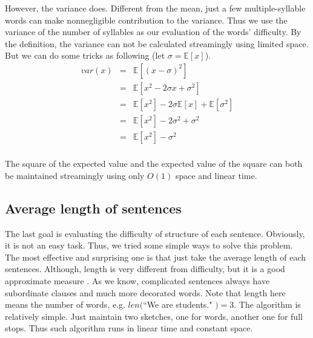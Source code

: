 \documentclass{article}
\begin{document}
		However, the variance does. Different from the mean, just a few multiple-syllable words can make nonnegligible contribution to the variance.
		Thus we use the variance of the number of syllables as our evaluation of the words' difficulty.
	\newline
	\newline
		By the definition, the variance can not be calculated streamingly using limited space. But we can do some tricks as following (let
		$\sigma = \mathbb{E} [x]$).
		\[\begin{array}{lll}
			var(x) & = & \mathbb{E} [(x - \sigma)^2]\\
			& = & \mathbb{E} [x^2 - 2\sigma x + \sigma^2]\\
			& = & \mathbb{E} [x^2] - 2\sigma \mathbb{E} [x] + \mathbb{E} [\sigma^2]\\
			& = & \mathbb{E} [x^2] - 2\sigma^2 + \sigma^2\\
			& = & \mathbb{E} [x^2] - \sigma^2\\
			\end{array}
		\]

		The square of the expected value and the expected value of the square can both be maintained streamingly using only $O(1)$ space and linear
		time.

	\subsection{Average length of sentences}
		The last goal is evaluating the difficulty of structure of each sentence. Obviously, it is not an easy task. Thus, we tried
		some simple ways to solve this problem. The most effective and surprising one is that just take the average length of each sentences.
	\newline
	\newline
		Although, length is very different from difficulty, but it is a good approximate measure \cite{chall}. As we know, complicated sentences always
		have subordinate clauses and much more decorated words. Note that length here means the number of words, e.g. $len($``We are students."
		$) = 3$.
	\newline
	\newline
		The algorithm is relatively simple. Just maintain two sketches, one for words, another one for full stops. Thus such algorithm runs
		in linear time and constant space.

\end{document}
